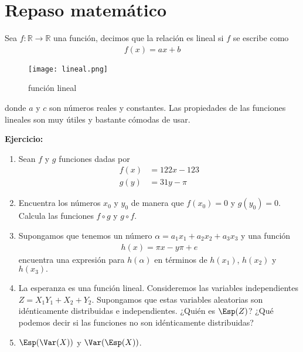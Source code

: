 \documentclass{assignment}
\begin{document}
\maketitle
\tableofcontents
\newpage

\section{Repaso matemático}
Sea $f:\mathbb{R} \to \mathbb{R}$ una función, decimos que la relación es lineal si $f$ se escribe como
\begin{align*}
    f(x)=ax+b
\end{align*}

\begin{figure}[h!]
    \centering
    \texttt{[image: lineal.png]}
    \caption{función lineal}
    \label{fig:my_label}
\end{figure}
donde $a$ y $c$ son números reales y constantes. Las propiedades de las funciones lineales son muy útiles y bastante cómodas de usar. 

\textbf{Ejercicio:}
\begin{enumerate}
    \item Sean $f$ y $g$ funciones dadas por 
\begin{align*}
    f(x) & = 122x-123 \\ 
    g(y) &= 31y - \pi
\end{align*}
 \item Encuentra los números $x_0$ y $y_0$ de manera que $f(x_0)=0$ y $g(y_0)=0$. Calcula las funciones $f \circ g$ y $g \circ f.$
    \item Supongamos que tenemos un número $\alpha= a_1 x_1 + a_2 x_2 + a_3 x_3$ y una función 
    \begin{align}
        h(x) = \pi x - y\pi + e 
    \end{align}
    encuentra una expresión para $h(\alpha)$ en términos de  $h(x_1)$, $h(x_2)$ y $h(x_3).$

    \item  La esperanza es una función lineal. Consideremos las variables independientes $Z=X_1 Y_1 + X_2+Y_2$. Supongamos que estas variables aleatorias son idénticamente distribuidas e independientes. ¿Quién es $\Esp(Z)$? ¿Qué podemos decir si las funciones no son idénticamente distribuidas? 
    \item $\Esp(\Var(X))$ y $\Var(\Esp(X))$. 
    
\end{enumerate}
\end{document}
